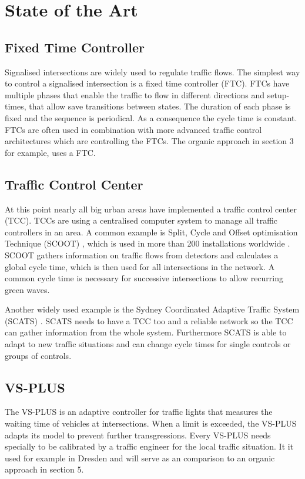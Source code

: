 \section{State of the Art}


\subsection{Fixed Time Controller}
Signalised intersections are widely used to regulate traffic flows. The simplest way to control a signalised intersection is a fixed time controller (FTC). FTCs have multiple phases that enable the traffic to flow in different directions and setup-times, that allow save transitions between states. The duration of each phase is fixed and the sequence is periodical. As a consequence the cycle time is constant. FTCs are often used in combination with more advanced traffic control architectures which are controlling the FTCs. The organic approach in section 3 for example, uses a FTC.

\subsection{Traffic Control Center}
At this point nearly all big urban areas have implemented a traffic control center (TCC). TCCs are using a centralised computer system to manage all traffic controllers in an area. A common example is Split, Cycle and Offset optimisation Technique (SCOOT) \cite{scoot}, which is used in more than 200 installations worldwide \cite{organic1}. SCOOT gathers information on traffic flows from detectors and calculates a global cycle time, which is then used for all intersections in the network. A common cycle time is necessary for successive intersections to allow recurring green waves. 

Another widely used example is the Sydney Coordinated Adaptive Traffic System (SCATS) \cite{scats}. SCATS needs to have a TCC too and a reliable network so the TCC can gather information from the whole system. Furthermore SCATS is able to adapt to new traffic situations and can change cycle times for single controls or groups of controls.

\subsection{VS-PLUS}
The VS-PLUS \cite{laemmer15} is an adaptive controller for traffic lights that measures the waiting time of vehicles at intersections. When a limit is exceeded, the VS-PLUS adapts its model to prevent further transgressions. Every VS-PLUS needs specially to be calibrated by a traffic engineer for the local traffic situation. It it used for example in Dresden and will serve as an comparison to an organic approach in section 5.